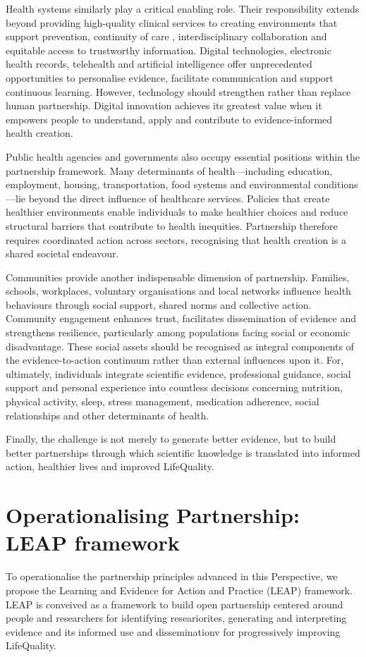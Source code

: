 \documentclass{article}
\begin{document}
Health systems similarly play a critical enabling role. Their responsibility extends beyond providing high-quality clinical services to creating environments that support prevention, continuity of care \cite{IOM2001} \cite{IOM2013}, interdisciplinary collaboration and equitable access to trustworthy information. Digital technologies, electronic health records, telehealth and artificial intelligence \cite{WHOAI2021} offer unprecedented opportunities to personalise evidence, facilitate communication and support continuous learning. However, technology should strengthen rather than replace human partnership. Digital innovation achieves its greatest value when it empowers people to understand, apply and contribute to evidence-informed health creation.

Public health agencies and governments also occupy essential positions within the partnership framework. Many determinants of health—including education, employment, housing, transportation, food systems and environmental conditions—lie beyond the direct influence of healthcare services. Policies that create healthier environments enable individuals to make healthier choices \cite{WHO1986} \cite{Marmot2012} \cite{IOM1988}  and reduce structural barriers that contribute to health inequities. Partnership therefore requires coordinated action across sectors, recognising that health creation is a shared societal endeavour.

Communities provide another indispensable dimension of partnership. Families, schools, workplaces, voluntary organisations and local networks influence health behaviours through social support, shared norms and collective action. Community engagement \cite{Cargo2008} enhances trust, facilitates dissemination of evidence and strengthens resilience, particularly among populations facing social or economic disadvantage. These social assets should be recognised as integral components of the evidence-to-action continuum rather than external influences upon it. For, ultimately, individuals integrate scientific evidence, professional guidance, social support and personal experience into countless decisions concerning nutrition, physical activity, sleep, stress management, medication adherence, social relationships and other determinants of health.

Finally, the challenge is not merely to generate better evidence, but to build better partnerships through which scientific knowledge is translated into informed action, healthier lives and improved LifeQuality. 
\section{Operationalising Partnership: LEAP framework}
\label{sec:org1f3a5b5}
To operationalise the partnership principles advanced in this Perspective, we propose the Learning and Evidence for Action and Practice (LEAP) framework. LEAP is conveived as a framework to build open partnership centered around people and researchers for identifying researiorites, generating and interpreting evidence and its informed use and disseminationv for  progressively improving LifeQuality.
\end{document}
